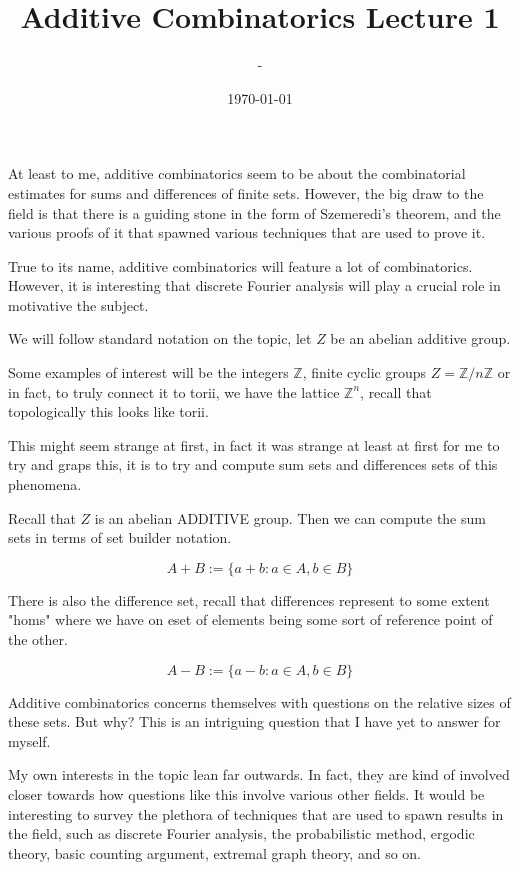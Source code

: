 \documentclass[12pt]{article}
\title{Additive Combinatorics Lecture 1}
\author{-}
\date{\today}
\begin{document}
\maketitle

At least to me, additive combinatorics seem to be about the combinatorial estimates for sums and differences of finite sets. However, the big draw to the field is that there is a guiding stone in the form of Szemeredi's theorem, and the various proofs of it that spawned various techniques that are used to prove it.

True to its name, additive combinatorics will feature a lot of combinatorics. However, it is interesting that discrete Fourier analysis will play a crucial role in motivative the subject.

We will follow standard notation on the topic, let $Z$ be an abelian additive group.

Some examples of interest will be the integers $\mathbb{Z}$, finite cyclic groups $Z = \mathbb{Z}/n\mathbb{Z}$ or in fact, to truly connect it to torii, we have the lattice $\mathbb{Z}^n$, recall that topologically this looks like torii.

This might seem strange at first, in fact it was strange at least at first for me to try and graps this, it is to try and compute sum sets and differences sets of this phenomena.

Recall that $Z$ is an abelian ADDITIVE group. Then we can compute the sum sets in terms of set builder notation.

\[A + B := \{a + b : a \in A, b \in B\}\]

There is also the difference set, recall that differences represent to some extent "homs" where we have on eset of elements being some sort of reference point of the other.

\[A - B := \{a - b : a \in A, b \in B\}\]

Additive combinatorics concerns themselves with questions on the relative sizes of these sets. But why? This is an intriguing question that I have yet to answer for myself.

My own interests in the topic lean far outwards. In fact, they are kind of involved closer towards how questions like this involve various other fields. It would be interesting to survey the plethora of techniques that are used to spawn results in the field, such as discrete Fourier analysis, the probabilistic method, ergodic theory, basic counting argument, extremal graph theory, and so on.
\end{document}
